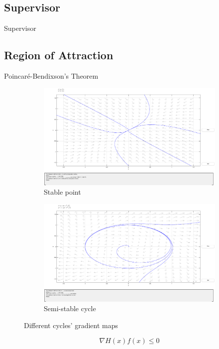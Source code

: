 \subsection{Supervisor}%
\label{subsec:supervisor}

\begin{slide}{Supervisor}
  
\end{slide}

\subsection{Region of Attraction}%
\label{subsec:roa}

\begin{slide}{Poincaré-Bendixson's Theorem}
  \begin{figure}[!htb]
    \centering
    \begin{subfigure}[b]{0.45\linewidth}
      \centering
      \includegraphics[trim=116 155 125 55,clip,width=\linewidth]{imgs/stable-point}
      \caption{Stable point}%
      \label{fig:stable-point}
    \end{subfigure}
    \begin{subfigure}[b]{0.45\linewidth}
      \centering
      \includegraphics[trim=116 155 125 55,clip,width=\linewidth]{imgs/semi-stable-cycle}
      \caption{Semi-stable cycle}%
      \label{fig:semi-stable-cycle}
    \end{subfigure}
    \caption{Different cycles' gradient maps}%
    \label{fig:poincare-cycles}
  \end{figure}
  \begin{equation}
    \nabla{}H(x)f(x) \leq 0
  \end{equation}
\end{slide}

